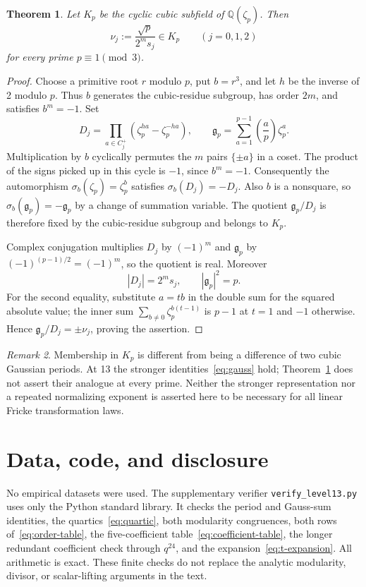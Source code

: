 \documentclass[11pt]{amsart}
\newtheorem{theorem}{Theorem}[section]
\theoremstyle{remark}
\newtheorem{remark}[theorem]{Remark}
\newcommand{\QQ}{\mathbb Q}
\begin{document}
\begin{theorem}\label{thm:membership}
Let $K_p$ be the cyclic cubic subfield of $\QQ(\zeta_p)$. Then
\[
 \nu_j:=\frac{\sqrt p}{2^ms_j}\in K_p\qquad(j=0,1,2)
\]
for every prime $p\equiv1\pmod3$.
\end{theorem}
\begin{proof}
Choose a primitive root $r$ modulo $p$, put $b=r^3$, and let $h$ be the inverse of 2 modulo $p$. Thus $b$ generates the cubic-residue subgroup, has order $2m$, and satisfies $b^m=-1$. Set
\[
 D_j=\prod_{a\in C_j^+}(\zeta_p^{ha}-\zeta_p^{-ha}),\qquad
 \mathfrak g_p=\sum_{a=1}^{p-1}\left(\frac ap\right)\zeta_p^a.
\]
Multiplication by $b$ cyclically permutes the $m$ pairs $\{\pm a\}$ in a coset. The product of the signs picked up in this cycle is $-1$, since $b^m=-1$. Consequently the automorphism $\sigma_b(\zeta_p)=\zeta_p^b$ satisfies
$\sigma_b(D_j)=-D_j$. Also $b$ is a nonsquare, so
$\sigma_b(\mathfrak g_p)=-\mathfrak g_p$ by a change of summation variable. The quotient $\mathfrak g_p/D_j$ is therefore fixed by the cubic-residue subgroup and belongs to $K_p$.

Complex conjugation multiplies $D_j$ by $(-1)^m$ and $\mathfrak g_p$ by $(-1)^{(p-1)/2}=(-1)^m$, so the quotient is real. Moreover
\[
 |D_j|=2^ms_j,\qquad |\mathfrak g_p|^2=p.
\]
For the second equality, substitute $a=tb$ in the double sum for the squared absolute value; the inner sum $\sum_{b\ne0}\zeta_p^{b(t-1)}$ is $p-1$ at $t=1$ and $-1$ otherwise. Hence
$\mathfrak g_p/D_j=\pm\nu_j$, proving the assertion.
\end{proof}

\begin{remark}\label{rem:scope}
Membership in $K_p$ is different from being a difference of two cubic Gaussian periods. At 13 the stronger identities~\eqref{eq:gauss} hold; Theorem~\ref{thm:membership} does not assert their analogue at every prime. Neither the stronger representation nor a repeated normalizing exponent is asserted here to be necessary for all linear Fricke transformation laws.
\end{remark}

\section*{Data, code, and disclosure}
No empirical datasets were used. The supplementary verifier
\texttt{verify\_level13.py} uses only the Python standard library. It
checks the period and Gauss-sum identities, the quartics~\eqref{eq:quartic},
both modularity congruences, both rows of~\eqref{eq:order-table}, the
five-coefficient table~\eqref{eq:coefficient-table}, the longer redundant
coefficient check through $q^{24}$, and the expansion~\eqref{eq:t-expansion}.
All arithmetic is exact. These finite checks do not replace the analytic
modularity, divisor, or scalar-lifting arguments in the text.
\end{document}
